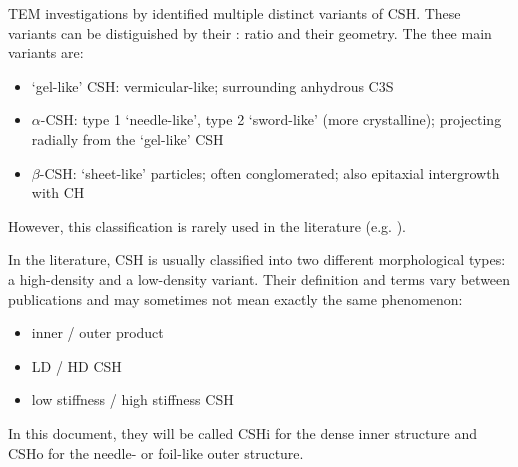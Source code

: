 \Ac{TEM} investigations by \textcite{melzer.1989} identified multiple distinct variants of \ac{CSH}. These variants can be distiguished by their : ratio and their geometry. The thee main variants are:
\begin{itemize}
    \item `gel-like' \ac{CSH}: vermicular-like; surrounding anhydrous \ac{C3S}
    \item $\alpha$-\ac{CSH}: type 1 `needle-like', type 2 `sword-like' (more crystalline); projecting radially from the `gel-like' \ac{CSH}
    \item $\beta$-\ac{CSH}: `sheet-like' particles; often conglomerated; also epitaxial intergrowth with \ac{CH} %
\end{itemize}

However, this classification is rarely used in the literature (e.g. \cite{nonat.2004,haas.2015}).

In the literature, \ac{CSH} is usually classified into two different morphological types: a high-density and a low-density variant.
Their definition and terms vary between publications and may sometimes not mean exactly the same phenomenon:
\begin{itemize}
    \item inner / outer product \cite{scrivener.1986, richardson.1993}
    \item \ac{LD} / \ac{HD} \ac{CSH} \cite{tennis.2000, jennings.2000}
    \item low stiffness / high stiffness \ac{CSH} \cite{constantinides.2004}
\end{itemize}

In this document, they will be called \ac{CSHi} for the dense inner structure and \ac{CSHo} for the needle- or foil-like outer structure.

